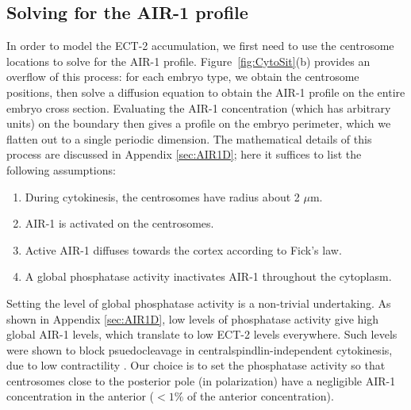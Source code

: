 \documentclass[11pt]{article}
\begin{document}
\subsection{Solving for the AIR-1 profile}
In order to model the ECT-2 accumulation, we first need to use the centrosome locations to solve for the AIR-1 profile. Figure\ \ref{fig:CytoSit}(b) provides an overflow of this process: for each embryo type, we obtain the centrosome positions, then solve a diffusion equation to obtain the AIR-1 profile on the entire embryo cross section. Evaluating the AIR-1 concentration (which has arbitrary units) on the boundary then gives a profile on the embryo perimeter, which we flatten out to a single periodic dimension. The mathematical details of this process are discussed in Appendix \ref{sec:AIR1D}; here it suffices to list the following assumptions:
\begin{enumerate}
\item During cytokinesis, the centrosomes have radius about 2 $\mu$m.
\item AIR-1 is activated on the centrosomes.
\item Active AIR-1 diffuses towards the cortex according to Fick's law.
\item A global phosphatase activity inactivates AIR-1 throughout the cytoplasm. 
\end{enumerate}
Setting the level of global phosphatase activity is a non-trivial undertaking. As shown in Appendix \ref{sec:AIR1D}, low levels of phosphatase activity give high global AIR-1 levels, which translate to low ECT-2 levels everywhere. Such levels were shown to block psuedocleavage in centralspindlin-independent cytokinesis, due to low contractility \cite{afshar2010regulation, kotak2016aurora}. Our choice is to set the phosphatase activity so that centrosomes close to the posterior pole (in polarization) have a negligible AIR-1 concentration in the anterior ($< 1\%$ of the anterior concentration).
\end{document}

